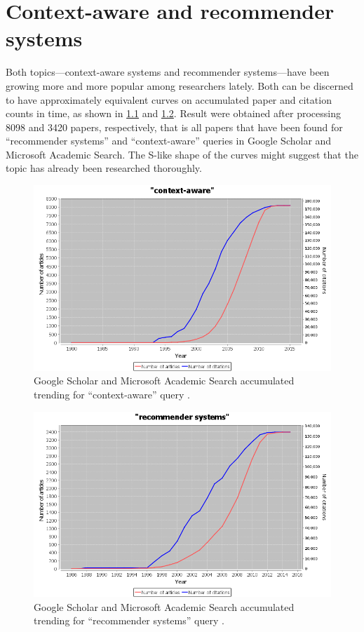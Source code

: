 \chapter{Context-aware and recommender systems}
\label{cha:recommenders}

Both topics---context-aware systems and recommender systems---have been growing more and more popular among researchers lately. Both can be discerned to have approximately equivalent curves on accumulated paper and citation counts in time, as shown in \cref{fig:scholar-context-aware} and \cref{fig:scholar-recommender-systems}. Result were obtained after processing 8098 and 3420 papers, respectively, that is all papers that have been found for ``recommender systems'' and ``context-aware'' queries in Google Scholar and Microsoft Academic Search. The S-like shape of the curves might suggest that the topic has already been researched thoroughly.

\begin{figure}
	\centering
	\includegraphics[width=\textwidth]{scholar-context-aware}
	\caption{Google Scholar and Microsoft Academic Search accumulated trending for ``context-aware'' query \cite{Rus:scholar-trends}.}
	\label{fig:scholar-context-aware}
\end{figure}

\begin{figure}
	\centering
	\includegraphics[width=\textwidth]{scholar-recommender-systems}
	\caption{Google Scholar and Microsoft Academic Search accumulated trending for ``recommender systems'' query \cite{Rus:scholar-trends}.}
	\label{fig:scholar-recommender-systems}
\end{figure}

